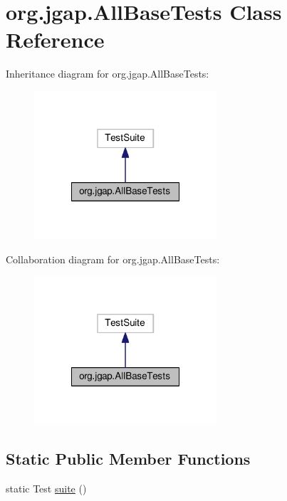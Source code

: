 \hypertarget{classorg_1_1jgap_1_1_all_base_tests}{\section{org.\-jgap.\-All\-Base\-Tests Class Reference}
\label{classorg_1_1jgap_1_1_all_base_tests}
}


Inheritance diagram for org.\-jgap.\-All\-Base\-Tests\-:
\nopagebreak
\begin{figure}[H]
\begin{center}
\leavevmode
\includegraphics[width=192pt]{classorg_1_1jgap_1_1_all_base_tests__inherit__graph}
\end{center}
\end{figure}


Collaboration diagram for org.\-jgap.\-All\-Base\-Tests\-:
\nopagebreak
\begin{figure}[H]
\begin{center}
\leavevmode
\includegraphics[width=192pt]{classorg_1_1jgap_1_1_all_base_tests__coll__graph}
\end{center}
\end{figure}
\subsection*{Static Public Member Functions}
\begin{DoxyCompactItemize}
\item 
static Test \hyperlink{classorg_1_1jgap_1_1_all_base_tests_aa766e11a49fe2d92a87cf5268454369b}{suite} ()
\end{DoxyCompactItemize}
